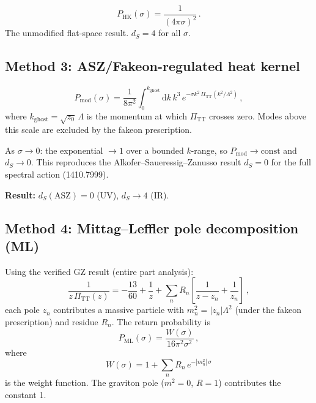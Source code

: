 \documentclass[11pt,a4paper]{article}
\newcommand{\dd}{\mathrm{d}}
\newcommand{\PiTT}{\Pi_{\mathrm{TT}}}
\newcommand{\ds}{d_S}
\begin{document}
\begin{equation}\label{eq:P-HK}
  P_{\mathrm{HK}}(\sigma) = \frac{1}{(4\pi\sigma)^2}\,.
\end{equation}
The unmodified flat-space result. $\ds = 4$ for all $\sigma$.

\subsection{Method 3: ASZ/Fakeon-regulated heat kernel}

\begin{equation}\label{eq:P-ASZ}
  P_{\mathrm{mod}}(\sigma) = \frac{1}{8\pi^2}
    \int_0^{k_{\mathrm{ghost}}} \dd k\,k^3\,
    e^{-\sigma k^2\,\PiTT(k^2/\Lambda^2)}\,,
\end{equation}
where $k_{\mathrm{ghost}} = \sqrt{z_0}\,\Lambda$ is the momentum
at which $\PiTT$ crosses zero. Modes above this scale are excluded
by the fakeon prescription.

As $\sigma \to 0$: the exponential $\to 1$ over a bounded $k$-range,
so $P_{\mathrm{mod}} \to \mathrm{const}$ and $\ds \to 0$.
This reproduces the Alkofer--Saueressig--Zanusso result
$\ds = 0$ for the full spectral action (1410.7999).

\textbf{Result:} $\ds(\mathrm{ASZ}) = 0$ (UV), $\ds \to 4$ (IR).

\subsection{Method 4: Mittag--Leffler pole decomposition (ML)}
\label{sec:ml}

Using the verified GZ result (entire part analysis):
\begin{equation}\label{eq:ML}
  \frac{1}{z\,\PiTT(z)} = -\frac{13}{60} + \frac{1}{z}
    + \sum_n R_n\left[\frac{1}{z-z_n} + \frac{1}{z_n}\right]\,,
\end{equation}
each pole $z_n$ contributes a massive particle with $m_n^2 = |z_n|\Lambda^2$
(under the fakeon prescription) and residue $R_n$. The return probability is
\begin{equation}\label{eq:P-ML}
  P_{\mathrm{ML}}(\sigma) = \frac{W(\sigma)}{16\pi^2\sigma^2}\,,
\end{equation}
where
\begin{equation}\label{eq:W}
  W(\sigma) = 1 + \sum_n R_n\,e^{-|m_n^2|\,\sigma}
\end{equation}
is the weight function. The graviton pole ($m^2 = 0$, $R = 1$)
contributes the constant 1.
\end{document}
